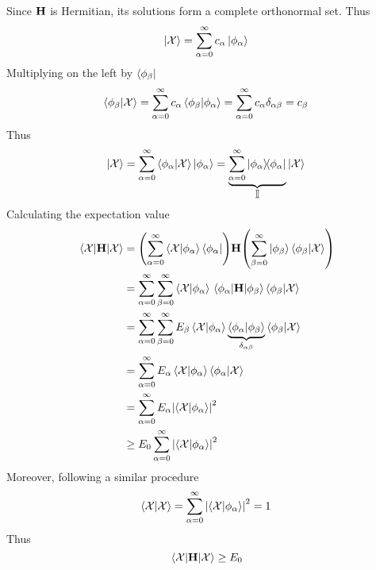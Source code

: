 \documentclass[12pt,a4paper,titlepage]{article}
\newcommand{\Chi}{\mathcal{X}} %
\newcommand{\id}{\mathbb{I}} %
\begin{document}
{Since $\vb{H}$ is Hermitian, its solutions form a complete orthonormal set. Thus
\begin{equation}
\ket{\Chi}=\sum_{\alpha=0}^{\infty}c_{\alpha}\ket{\phi_{\alpha}}
\end{equation}
Multiplying on the left by $\bra{\phi_{\beta}}$
\begin{equation}
\ip{\phi_{\beta}}{\Chi}=\sum_{\alpha=0}^{\infty}c_{\alpha}\ip{\phi_{\beta}}{\phi_{\alpha}}=\sum_{\alpha=0}^{\infty}c_{\alpha}\delta_{\alpha\beta}=c_{\beta}
\end{equation}
Thus
\begin{equation}
\ket{\Chi}=\sum_{\alpha=0}^{\infty}\ip{\phi_{\alpha}}{\Chi}\ket{\phi_{\alpha}}=\underbrace{\sum_{\alpha=0}^{\infty}\op{\phi_{\alpha}}{\phi_{\alpha}}}_{\textstyle\id}\ket{\Chi}
\end{equation}
Calculating the expectation value
\begin{equation}
\begin{aligned}
\mel{\Chi}{\vb{H}}{\Chi}&=\qty(\sum_{\alpha=0}^{\infty}\ip{\Chi}{\phi_{\alpha}}\bra{\phi_{\alpha}})\vb{H}\qty(\sum_{\beta=0}^{\infty}\ket{\phi_{\beta}}\ip{\phi_{\beta}}{\Chi})\\
&=\sum_{\alpha=0}^{\infty}\sum_{\beta=0}^{\infty}\ip{\Chi}{\phi_{\alpha}}\mel{\phi_{\alpha}}{\vb{H}}{\phi_{\beta}}\ip{\phi_{\beta}}{\Chi}\\
&=\sum_{\alpha=0}^{\infty}\sum_{\beta=0}^{\infty}E_{\beta}\ip{\Chi}{\phi_{\alpha}}\underbrace{\ip{\phi_{\alpha}}{\phi_{\beta}}}_{\delta_{\alpha\beta}}\ip{\phi_{\beta}}{\Chi}\\
&=\sum_{\alpha=0}^{\infty}E_{\alpha}\ip{\Chi}{\phi_{\alpha}}\ip{\phi_{\alpha}}{\Chi}\\
&=\sum_{\alpha=0}^{\infty}E_{\alpha}\abs{\ip{\Chi}{\phi_{\alpha}}}^{2}\\
&\geq E_{0}\sum_{\alpha=0}^{\infty}\abs{\ip{\Chi}{\phi_{\alpha}}}^{2}
\end{aligned}
\end{equation}
Moreover, following a similar procedure
\begin{equation}
\ip{\Chi}{\Chi}=\sum_{\alpha=0}^{\infty}\abs{\ip{\Chi}{\phi_{\alpha}}}^{2}=1
\end{equation}
Thus
\begin{equation}
\mel{\Chi}{\vb{H}}{\Chi}\geq E_{0}
\end{equation}
}
\end{document}
